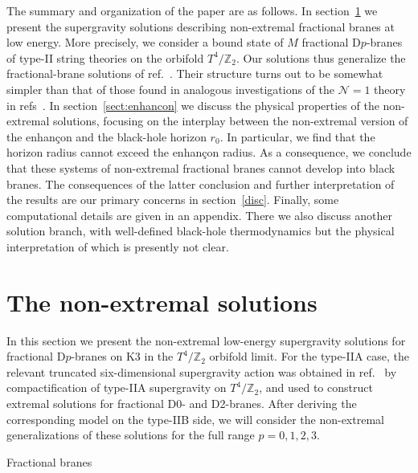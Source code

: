 \documentclass[a4paper,11pt]{article}
\makeatletter
\renewcommand{\subsection}{\@startsection{subsection}{2}{\z@} {-3.25ex
plus -1ex minus -.2ex}{1.5ex plus .2ex}{\normalsize\bf}}
\newcommand{\ZZ}{\mathbb{Z}}  \newcommand{\Zint}{\mathbb{Z}}
\makeatother
\begin{document}
The summary and organization of the paper are as follows. In
section~\ref{sect:solutions} we present the supergravity solutions
describing non-extremal fractional branes at low energy. More
precisely, we consider a bound state of $M$ fractional D$p$-branes of
type-II string theories on the orbifold $T^4\!/\ZZ_2$. Our solutions
thus generalize the fractional-brane solutions of
ref.~\cite{Frau:2000gk}. Their structure turns out to be somewhat
simpler than that of those found in analogous investigations of the
$\mathcal{N}=1$ theory in
refs~\cite{Buchel:2000ch,Buchel:2001gw,Gubser:2001ri}. In
section~\ref{sect:enhancon} we discuss the physical properties of the
non-extremal solutions, focusing on the interplay between the
non-extremal version of the enhan\c{c}on and the black-hole horizon
$r_0$. In particular, we find that the horizon radius cannot exceed
the enhan\c{c}on radius. As a consequence, we conclude that these
systems of non-extremal fractional branes cannot develop into black
branes. The consequences of the latter conclusion and further
interpretation of the results are our primary concerns in
section~\ref{disc}. Finally, some computational details are given in
an appendix. There we also discuss another solution branch, with
well-defined black-hole thermodynamics but the physical interpretation
of which is presently not clear.



\vspace{1ex}
\section{The non-extremal solutions}
\label{sect:solutions}

In this section we present the non-extremal low-energy supergravity
solutions for fractional D$p$-branes on K3 in the $T^4\!/\ZZ_2$
orbifold limit. For the type-IIA case, the relevant truncated
six-dimensional supergravity action was obtained in
ref.~\cite{Frau:2000gk} by compactification of type-IIA supergravity
on $T^4\!/\ZZ_2$, and used to construct extremal solutions for
fractional D0- and D2-branes. After deriving the corresponding model
on the type-IIB side, we will consider the non-extremal generalizations
of these solutions for the full range $p=0,1,2,3$.


\subsection{Fractional branes}
\end{document}
